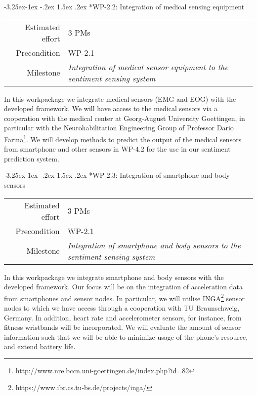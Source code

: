 \documentclass[12pt]{article}
\makeatletter
\renewcommand\paragraph{\@startsection{paragraph}{4}{\z@}%
  {-3.25ex\@plus -1ex \@minus -.2ex}%
  {1.5ex \@plus .2ex}%
  {\normalfont\normalsize\bfseries}}
\makeatother
\begin{document}
\paragraph*{WP-2.2: Integration of medical sensing equipment}
\begin{tabular}{rl}
	Estimated effort& 3 PMs\\
	Precondition & WP-2.1\\
	Milestone & \begin{minipage}[t]{12.2cm}
		\textit{Integration of medical sensor equipment to the sentiment sensing system}\vspace{.2cm}
	\end{minipage}
\end{tabular}

\noindent
In this workpackage we integrate medical sensors (EMG and EOG) with the developed framework. 
We will have access to the medical sensors via a cooperation with the medical center at Georg-August University Goettingen, in particular with the Neurohabilitation Engineering Group of Professor Dario Farina\footnote{http://www.nre.bccn.uni-goettingen.de/index.php?id=82}. 
We will develop methods to predict the output of the medical sensors from smartphone and other sensors in WP-4.2 for the use in our sentiment prediction system.

\paragraph*{WP-2.3: Integration of smartphone and body sensors}
\begin{tabular}{rl}
 Estimated effort& 3 PMs\\
 Precondition & WP-2.1\\
 Milestone & \begin{minipage}[t]{12.2cm}
\textit{Integration of smartphone and body sensors to the sentiment sensing system}\vspace{.2cm}
             \end{minipage}
\end{tabular}

\noindent
In this workpackage we integrate smartphone and body sensors with the developed framework. 
Our focus will be on the integration of acceleration data from smartphones and sensor nodes. 
In particular, we will utilise INGA\footnote{https://www.ibr.cs.tu-bs.de/projects/inga/} sensor nodes to which we have access through a cooperation with TU Braunschweig, Germany. 
In addition, heart rate and accelerometer sensors, for instance, from fitness wristbands will be incorporated. 
We will evaluate the amount of sensor information such that we will be able to minimize usage of the phone's resource, and extend battery life.
\end{document}
